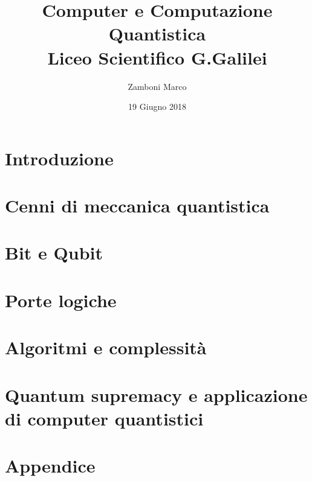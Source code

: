 \documentclass[10pt,twoside]{report}
\author{Zamboni Marco}
\date{19 Giugno 2018}
\title{{Computer e Computazione Quantistica}\\
		{\large Liceo Scientifico G.Galilei}}
\begin{document}

\tableofcontents
\chapter{Introduzione}

\chapter{Cenni di meccanica quantistica}

\chapter{Bit e Qubit}

\chapter{Porte logiche}

\chapter{Algoritmi e complessità}

\chapter{Quantum supremacy e applicazione di computer quantistici}

\appendix
\chapter{Appendice}

\end{document}
